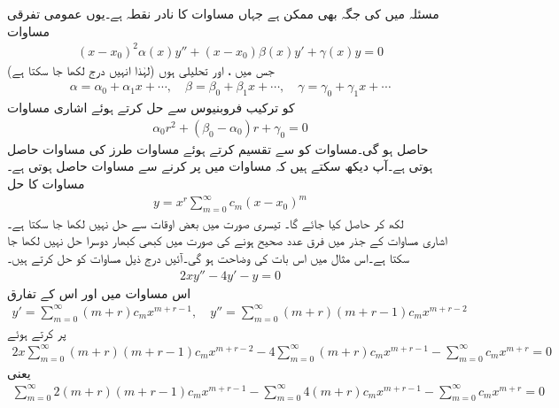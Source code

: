 مسئلہ  میں  کی جگہ  بھی ممکن ہے جہاں  مساوات کا نادر نقطہ ہے۔یوں عمومی تفرقی مساوات 
\begin{align}\label{مساوات_بیسل_عمومی_ترکیب_فروبنیوس}
(x-x_0)^2 \alpha(x) y'' +(x-x_0)\beta(x)y'+\gamma(x)y=0
\end{align}
جس میں  ،  اور  تحلیلی ہوں (لہٰذا انہیں درج لکھا جا سکتا ہے) 
\begin{align*}
\alpha=\alpha_0+\alpha_1x+\cdots,\quad \beta=\beta_0+\beta_1x+\cdots, \quad \gamma=\gamma_0+\gamma_1x+\cdots
\end{align*}
کو ترکیب فروبنیوس سے حل کرتے ہوئے اشاری مساوات
\begin{align}
\alpha_0 r^2+(\beta_0-\alpha_0)r+\gamma_0=0
\end{align}
حاصل ہو گی۔مساوات  کو  سے تقسیم کرتے ہوئے مساوات  طرز کی مساوات حاصل ہوتی ہے۔آپ دیکھ سکتے ہیں کہ مساوات  میں  پر کرنے سے  مساوات  حاصل ہوتی ہے۔مساوات  کا حل
\begin{align}
y=x^r\sum_{m=0}^{\infty} c_m (x-x_0)^m
\end{align}
لکھ کر حاصل کیا جائے گا۔
\quad تیسری صورت میں بعض اوقات  سے حل نہیں لکھا جا سکتا ہے۔\\
اشاری مساوات کے جذر میں فرق عدد صحیح ہونے کی صورت میں کبھی کبھار دوسرا حل  نہیں لکھا جا سکتا ہے۔اس مثال میں اس بات کی وضاحت ہو گی۔آئیں درج ذیل مساوات کو حل کرتے ہیں۔
\begin{align*}
2xy''-4y'-y=0
\end{align*}
اس مساوات میں  اور اس کے تفارق
\begin{align*}
y'=\sum_{m=0}^{\infty} (m+r)c_mx^{m+r-1},\quad y''=\sum_{m=0}^{\infty} (m+r)(m+r-1)c_mx^{m+r-2}
\end{align*}
پر کرتے ہوئے
\begin{align*}
2x\sum_{m=0}^{\infty} (m+r)(m+r-1)c_mx^{m+r-2}-4\sum_{m=0}^{\infty}(m+r)c_mx^{m+r-1}-\sum_{m=0}^{\infty}c_mx^{m+r}=0
\end{align*}
یعنی
\begin{align*}
\sum_{m=0}^{\infty}2 (m+r)(m+r-1)c_mx^{m+r-1}-\sum_{m=0}^{\infty}4(m+r)c_mx^{m+r-1}-\sum_{m=0}^{\infty}c_mx^{m+r}=0
\end{align*}
